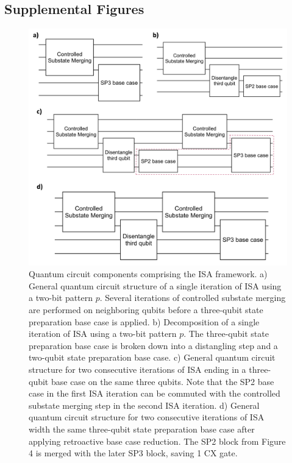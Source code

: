 \subsection*{Supplemental Figures}
\setcounter{figure}{0} %
\renewcommand{\thefigure}{S\arabic{figure}} %


\begin{figure}[h]
\centering
\includegraphics[width=0.95\linewidth]{main/figs/sfig_1.png}
\caption{Quantum circuit components comprising the ISA framework. a) General quantum circuit structure of a single iteration of ISA using a
two-bit pattern $p$. Several iterations of controlled substate merging are
performed on neighboring qubits before a three-qubit state preparation base case
is applied. b) Decomposition of a single iteration of ISA using a two-bit pattern $p$.
The three-qubit state preparation base case is broken down into a distangling
step and a two-qubit state preparation base case. c) General quantum circuit structure for two consecutive iterations of ISA
ending in a three-qubit base case on the same three qubits. Note that the SP2 
base case in the first ISA iteration can be commuted with the controlled substate
merging step in the second ISA iteration. d) General quantum circuit structure for two consecutive iterations of ISA
width the same three-qubit state preparation base case after applying retroactive
base case reduction. The SP2 block from Figure 4 is merged with the later SP3
block, saving 1 CX gate.}
\label{sfig1}
\end{figure}

